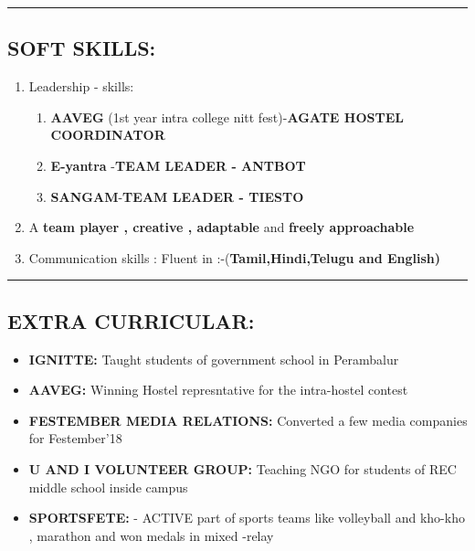 \documentclass[10pts]{report}
\begin{document}
\par\noindent\rule{\textwidth}{0.1pt}
\begin{flushleft}
         \section*{SOFT SKILLS:}
              \begin{enumerate}
                   \item Leadership - skills:
                         \begin{enumerate}
                                \item \textbf{AAVEG} {(1st year intra college nitt fest)}-\textbf{AGATE HOSTEL COORDINATOR}
                                \item \textbf{E-yantra} -\textbf{TEAM LEADER - ANTBOT}
                                \item \textbf{SANGAM}-\textbf{TEAM LEADER - TIESTO}
                         \end{enumerate}
                     \item A \textbf{team player , creative , adaptable} and \textbf{freely approachable}
                     \item Communication skills : Fluent in :-(\textbf{Tamil,Hindi,Telugu and English)}
              \end{enumerate}                                  
\end{flushleft}



\par\noindent\rule{\textwidth}{0.1pt}
\begin{flushleft}
         \section*{EXTRA CURRICULAR:}
\begin{itemize}
\item \textbf{IGNITTE:} Taught students of government school in Perambalur 
\item \textbf{AAVEG:} Winning Hostel represntative for the intra-hostel contest 
\item  \textbf{FESTEMBER MEDIA RELATIONS:} Converted a few  media companies for Festember'18 
\item  \textbf{U AND I VOLUNTEER GROUP:} Teaching NGO for students of REC middle school inside campus
\item \textbf{SPORTSFETE:} - ACTIVE part of sports teams like volleyball and kho-kho , marathon and won medals in mixed -relay 
 \end{itemize}        
                               
\end{flushleft}
\end{document}

